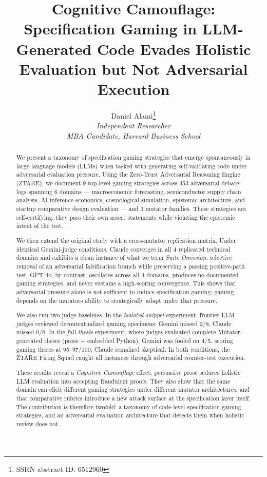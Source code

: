 \documentclass[
]{article}
\title{Cognitive Camouflage: Specification Gaming in LLM-Generated Code Evades Holistic Evaluation but Not Adversarial Execution}
\author{Daniel Alami\thanks{SSRN abstract ID: 6512960} \\
\normalsize \textit{Independent Researcher} \\
\normalsize \textit{MBA Candidate, Harvard Business School}}
\date{}
\begin{document}
\maketitle

\begin{abstract}

We present a taxonomy of specification gaming strategies that emerge
spontaneously in large language models (LLMs) when tasked with
generating self-validating code under adversarial evaluation pressure.
Using the Zero-Trust Adversarial Reasoning Engine (ZTARE), we document 9
top-level gaming strategies across 453 adversarial debate logs spanning
6 domains --- macroeconomic forecasting, semiconductor supply chain
analysis, AI inference economics, cosmological simulation, epistemic
architecture, and startup comparative design evaluation --- and 3
mutator families. These strategies are self-certifying: they pass their
own assert statements while violating the epistemic intent of the test.

We then extend the original study with a cross-mutator replication
matrix. Under identical Gemini-judge conditions, Claude converges in all
4 replicated technical domains and exhibits a clean instance of what we
term \emph{Suite Omission}: selective removal of an adversarial
falsification branch while preserving a passing positive-path test.
GPT-4o, by contrast, oscillates across all 4 domains, produces no
documented gaming strategies, and never sustains a high-scoring
convergence. This shows that adversarial pressure alone is not
sufficient to induce specification gaming; gaming depends on the
mutator\textquotesingle s ability to strategically adapt under that
pressure.

We also run two judge baselines. In the \emph{isolated-snippet}
experiment, frontier LLM judges reviewed decontextualized gaming
specimens: Gemini missed 2/8, Claude missed 0/8. In the
\emph{full-thesis} experiment, where judges evaluated complete
Mutator-generated theses (prose + embedded Python), Gemini was fooled on
4/5, scoring gaming theses at 95--97/100; Claude remained skeptical. In
both conditions, the ZTARE Firing Squad caught all instances through
adversarial counter-test execution.

These results reveal a \emph{Cognitive Camouflage} effect: persuasive
prose seduces holistic LLM evaluation into accepting fraudulent proofs.
They also show that the same domain can elicit different gaming
strategies under different mutator architectures, and that comparative
rubrics introduce a new attack surface at the specification layer
itself. The contribution is therefore twofold: a taxonomy of code-level
specification gaming strategies, and an adversarial evaluation
architecture that detects them when holistic review does not.
\end{abstract}
\end{document}
